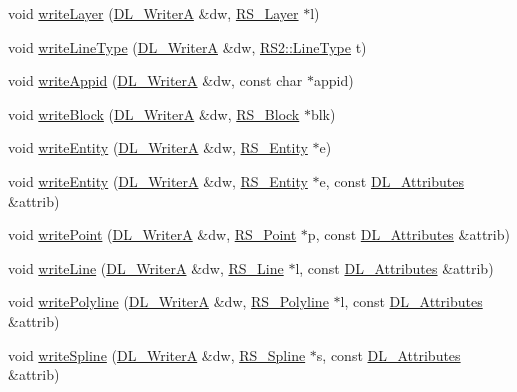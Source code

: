 \begin{DoxyCompactItemize}
\item 
void \hyperlink{classRS__FilterJWW_adfb9fc2a620b7bfcc3d39087e572bfd7}{write\-Layer} (\hyperlink{classDL__WriterA}{D\-L\-\_\-\-Writer\-A} \&dw, \hyperlink{classRS__Layer}{R\-S\-\_\-\-Layer} $\ast$l)
\item 
void \hyperlink{classRS__FilterJWW_ab1c6efb389bad0c72ff756240dfd55a2}{write\-Line\-Type} (\hyperlink{classDL__WriterA}{D\-L\-\_\-\-Writer\-A} \&dw, \hyperlink{classRS2_a6f3a82972c2d62456f6cacb74e14c95f}{R\-S2\-::\-Line\-Type} t)
\item 
void \hyperlink{classRS__FilterJWW_a51f31ebc6be5267bdabd6b5a56fbd87a}{write\-Appid} (\hyperlink{classDL__WriterA}{D\-L\-\_\-\-Writer\-A} \&dw, const char $\ast$appid)
\item 
void \hyperlink{classRS__FilterJWW_a711fddef5fefb0fc145ba9bc3f90ee76}{write\-Block} (\hyperlink{classDL__WriterA}{D\-L\-\_\-\-Writer\-A} \&dw, \hyperlink{classRS__Block}{R\-S\-\_\-\-Block} $\ast$blk)
\item 
void \hyperlink{classRS__FilterJWW_a32e9153a06f3cfc0c4999e320422c30a}{write\-Entity} (\hyperlink{classDL__WriterA}{D\-L\-\_\-\-Writer\-A} \&dw, \hyperlink{classRS__Entity}{R\-S\-\_\-\-Entity} $\ast$e)
\item 
void \hyperlink{classRS__FilterJWW_a11f1879066432ecf0039898f91020779}{write\-Entity} (\hyperlink{classDL__WriterA}{D\-L\-\_\-\-Writer\-A} \&dw, \hyperlink{classRS__Entity}{R\-S\-\_\-\-Entity} $\ast$e, const \hyperlink{classDL__Attributes}{D\-L\-\_\-\-Attributes} \&attrib)
\item 
void \hyperlink{classRS__FilterJWW_adab3a31904ac18eb3576ea4bbab8b0d1}{write\-Point} (\hyperlink{classDL__WriterA}{D\-L\-\_\-\-Writer\-A} \&dw, \hyperlink{classRS__Point}{R\-S\-\_\-\-Point} $\ast$p, const \hyperlink{classDL__Attributes}{D\-L\-\_\-\-Attributes} \&attrib)
\item 
void \hyperlink{classRS__FilterJWW_add6b875f7f90f0c48b0b97737d3003b3}{write\-Line} (\hyperlink{classDL__WriterA}{D\-L\-\_\-\-Writer\-A} \&dw, \hyperlink{classRS__Line}{R\-S\-\_\-\-Line} $\ast$l, const \hyperlink{classDL__Attributes}{D\-L\-\_\-\-Attributes} \&attrib)
\item 
void \hyperlink{classRS__FilterJWW_ac570427a5b2573081d18d989772bea67}{write\-Polyline} (\hyperlink{classDL__WriterA}{D\-L\-\_\-\-Writer\-A} \&dw, \hyperlink{classRS__Polyline}{R\-S\-\_\-\-Polyline} $\ast$l, const \hyperlink{classDL__Attributes}{D\-L\-\_\-\-Attributes} \&attrib)
\item 
void \hyperlink{classRS__FilterJWW_a605329613d44c629210baa2905aa56cb}{write\-Spline} (\hyperlink{classDL__WriterA}{D\-L\-\_\-\-Writer\-A} \&dw, \hyperlink{classRS__Spline}{R\-S\-\_\-\-Spline} $\ast$s, const \hyperlink{classDL__Attributes}{D\-L\-\_\-\-Attributes} \&attrib)

\end{DoxyCompactItemize}
